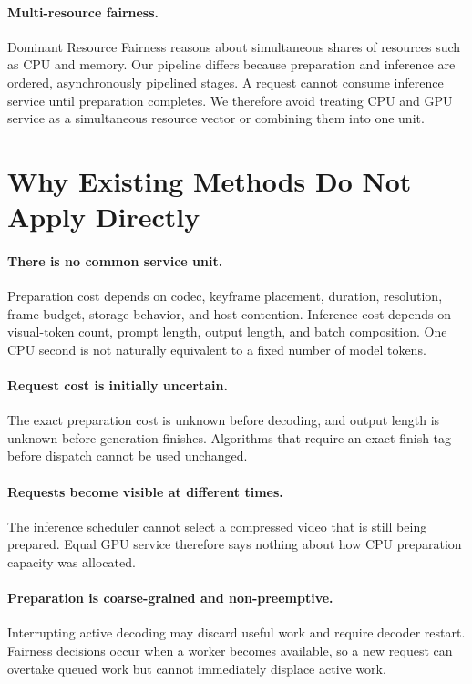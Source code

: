 \documentclass[sigplan,anonymous,review,nonacm]{acmart}
\begin{document}
\paragraph{Multi-resource fairness.}
Dominant Resource Fairness reasons about simultaneous shares of resources such
as CPU and memory. Our pipeline differs because preparation and inference are
ordered, asynchronously pipelined stages. A request cannot consume inference
service until preparation completes. We therefore avoid treating CPU and GPU
service as a simultaneous resource vector or combining them into one unit.

\section{Why Existing Methods Do Not Apply Directly}

\paragraph{There is no common service unit.}
Preparation cost depends on codec, keyframe placement, duration, resolution,
frame budget, storage behavior, and host contention. Inference cost depends on
visual-token count, prompt length, output length, and batch composition. One
CPU second is not naturally equivalent to a fixed number of model tokens.

\paragraph{Request cost is initially uncertain.}
The exact preparation cost is unknown before decoding, and output length is
unknown before generation finishes. Algorithms that require an exact finish
tag before dispatch cannot be used unchanged.

\paragraph{Requests become visible at different times.}
The inference scheduler cannot select a compressed video that is still being
prepared. Equal GPU service therefore says nothing about how CPU preparation
capacity was allocated.

\paragraph{Preparation is coarse-grained and non-preemptive.}
Interrupting active decoding may discard useful work and require decoder
restart. Fairness decisions occur when a worker becomes available, so a new
request can overtake queued work but cannot immediately displace active work.
\end{document}
